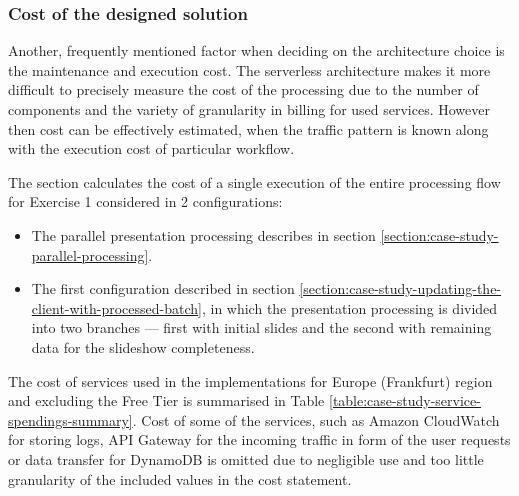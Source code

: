 \subsubsection{Cost of the designed solution}

Another, frequently mentioned factor when deciding on the architecture choice is the maintenance and execution cost. The serverless architecture makes it more difficult to precisely measure the cost of the processing due to the number of components and the variety of granularity in billing for used services. However then cost can be effectively estimated, when the traffic pattern is known along with the execution cost of particular workflow.

The section calculates the cost of a single execution of the entire processing flow for Exercise 1 considered in 2 configurations:

\begin{itemize}
   \item The parallel presentation processing describes in section \ref{section:case-study-parallel-processing}.
   \item The first configuration described in section \ref{section:case-study-updating-the-client-with-processed-batch}, in which the presentation processing is divided into two branches --- first with initial slides and the second with remaining data for the slideshow completeness.
\end{itemize}

The cost of services used in the implementations for Europe (Frankfurt) region and excluding the Free Tier is summarised in Table \ref{table:case-study-service-spendings-summary}. Cost of some of the services, such as Amazon CloudWatch for storing logs, API Gateway for the incoming traffic in form of the user requests or data transfer for DynamoDB is omitted due to negligible use and too little granularity of the included values in the cost statement.

